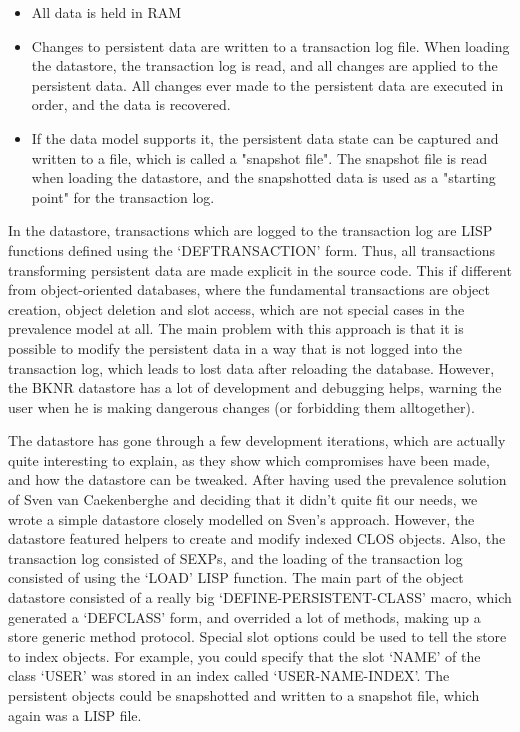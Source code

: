\begin{itemize}
\item All data is held in RAM

\item Changes to persistent data are written to a transaction log
   file. When loading the datastore, the transaction log is read, and
   all changes are applied to the persistent data. All changes ever
   made to the persistent data are executed in order, and the data is
   recovered.

\item If the data model supports it, the persistent data state can be
   captured and written to a file, which is called a "snapshot
   file". The snapshot file is read when loading the datastore, and
   the snapshotted data is used as a "starting point" for the
   transaction log.
\end{itemize}

In the datastore, transactions which are logged to the transaction log
are LISP functions defined using the `DEFTRANSACTION' form. Thus, all
transactions transforming persistent data are made explicit in the
source code. This if different from object-oriented databases, where
the fundamental transactions are object creation, object deletion and
slot access, which are not special cases in the prevalence model at
all. The main problem with this approach is that it is possible to
modify the persistent data in a way that is not logged into the
transaction log, which leads to lost data after reloading the
database. However, the BKNR datastore has a lot of development and
debugging helps, warning the user when he is making dangerous changes
(or forbidding them alltogether).

The datastore has gone through a few development iterations, which are
actually quite interesting to explain, as they show which compromises
have been made, and how the datastore can be tweaked. After having
used the prevalence solution of Sven van Caekenberghe and deciding
that it didn't quite fit our needs, we wrote a simple datastore
closely modelled on Sven's approach. However, the datastore featured
helpers to create and modify indexed CLOS objects. Also, the
transaction log consisted of SEXPs, and the loading of the transaction
log consisted of using the `LOAD' LISP function. The main part of the
object datastore consisted of a really big `DEFINE-PERSISTENT-CLASS'
macro, which generated a `DEFCLASS' form, and overrided a lot of
methods, making up a store generic method protocol. Special slot
options could be used to tell the store to index objects. For example,
you could specify that the slot `NAME' of the class `USER' was stored
in an index called `USER-NAME-INDEX'. The persistent objects could be
snapshotted and written to a snapshot file, which again was a LISP
file.

